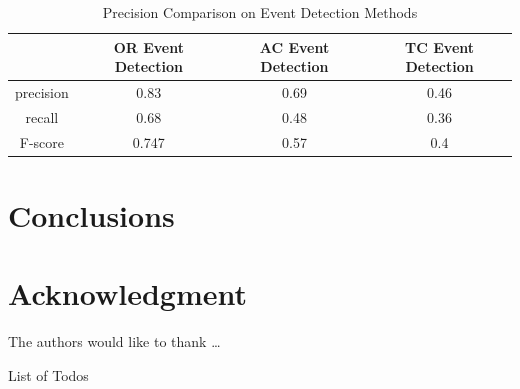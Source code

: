 \documentclass{amsart}
\makeatletter
\def\listtodoname{List of Todos}
\def\listoftodos{\@starttoc{tdo}\listtodoname}
\theoremstyle{definition}
\theoremstyle{remark}
\numberwithin{equation}{section}
\makeatother
\begin{document}
\blindmathpaper

\begin{table}  \centering
  \caption{Precision Comparison on Event Detection Methods}
  \label{tbl:overall-experiments}
  \begin{tabular}{cccc}
\toprule
    & OR Event Detection & AC Event Detection & TC Event Detection \\
\midrule
    precision & 0.83 & 0.69 & 0.46 \\
    recall & 0.68 & 0.48 & 0.36 \\
    F-score & 0.747 & 0.57 & 0.4 \\
\bottomrule
\end{tabular}
\end{table}



\section{Conclusions} \label{sec-conclusions}

\blindtext


\lipsum[1]


\section*{Acknowledgment}

The authors would like to thank \ldots

\newpage
%



\listoftodos
\end{document}
